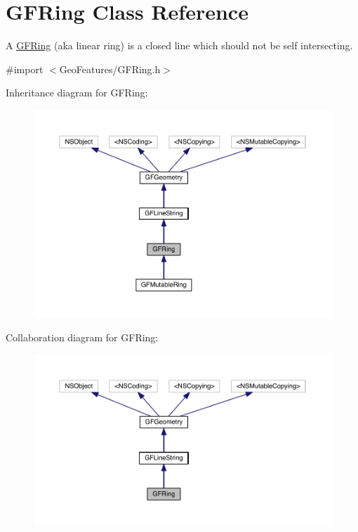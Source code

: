 \hypertarget{interface_g_f_ring}{}\section{G\+F\+Ring Class Reference}
\label{interface_g_f_ring}


A \hyperlink{interface_g_f_ring}{G\+F\+Ring} (aka linear ring) is a closed line which should not be self intersecting.  




{\ttfamily \#import $<$Geo\+Features/\+G\+F\+Ring.\+h$>$}



Inheritance diagram for G\+F\+Ring\+:\nopagebreak
\begin{figure}[H]
\begin{center}
\leavevmode
\includegraphics[width=350pt]{interface_g_f_ring__inherit__graph}
\end{center}
\end{figure}


Collaboration diagram for G\+F\+Ring\+:\nopagebreak
\begin{figure}[H]
\begin{center}
\leavevmode
\includegraphics[width=350pt]{interface_g_f_ring__coll__graph}
\end{center}
\end{figure}
